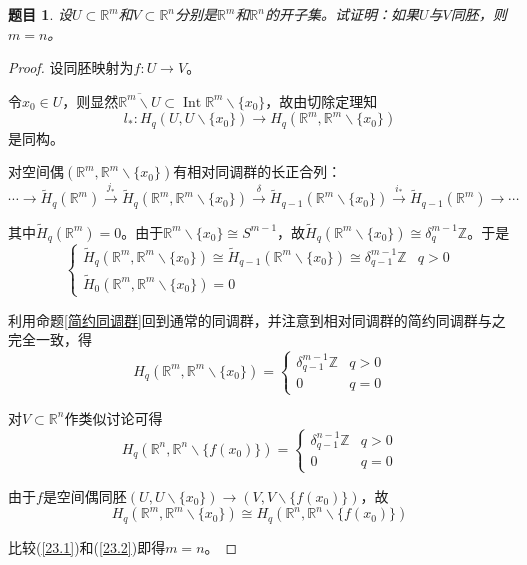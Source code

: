 \documentclass[UTF-8,11pt,fancyhdr,hyperref,titlepage]{ctexart}
\theoremstyle{question}
\newtheorem{timu}{题目}
\theoremstyle{theorem}
\theoremstyle{definition}
\theoremstyle{remark}
\def\RR{{\mathbb R}}
\def\ZZ{{\mathbb Z}}
\def\longto{\longrightarrow}
\def\To{\longto}
\newcommand{\markar}[1]{\stackrel{{#1}}{\longrightarrow}}%
\newcommand{\rH}[1]{\widetilde{H}_{#1}}
\DeclareMathOperator{\Int}{Int}
\begin{document}
\begin{timu}\label{23}
  设$U\subset\RR^m$和$V\subset\RR^n$分别是$\RR^m$和$\RR^n$的开子集。试证明：如果$U$与$V$同胚，则$m=n$。
\end{timu}
\begin{proof}
  设同胚映射为$f\colon U\To V$。

  令$x_0\in U$，则显然$\overline{\RR^m\backslash U}\subset\Int \RR^m\backslash\{x_0\}$，故由切除定理知
  \begin{equation*}
    l_{\ast}\colon H_q(U,U\backslash\{x_0\}) \To H_q(\RR^m,\RR^m\backslash\{x_0\})
  \end{equation*}
  是同构。

  对空间偶$(\RR^m, \RR^m\backslash\{x_0\})$有相对同调群的长正合列：
  \begin{equation*}
    \cdots\To \rH{q}(\RR^m) \markar{j_{\ast}} \rH{q}(\RR^m, \RR^m\backslash\{x_0\}) \markar{\delta} \rH{q-1}(\RR^m\backslash\{x_0\}) \markar{i_{\ast}} \rH{q-1}(\RR^m) \To \cdots
  \end{equation*}
  
  其中$\rH{q}(\RR^m)=0$。由于$\RR^m\backslash\{x_0\}\cong S^{m-1}$，故$\rH{q}(\RR^m\backslash\{x_0\})\cong\delta_q^{m-1}\ZZ$。于是
  \begin{equation*}
    \begin{cases}
      \rH{q}(\RR^m,\RR^m\backslash\{x_0\})\cong\rH{q-1}(\RR^m\backslash\{x_0\})\cong\delta_{q-1}^{m-1}\ZZ& q>0\\
      \rH{0}(\RR^m,\RR^m\backslash\{x_0\})=0
    \end{cases}
  \end{equation*}

  利用命题\ref{简约同调群}回到通常的同调群，并注意到相对同调群的简约同调群与之完全一致，得
  \begin{equation}\label{23.1}
    H_q(\RR^m,\RR^m\backslash\{x_0\})=
    \begin{cases}
      \delta_{q-1}^{m-1}\ZZ & q>0\\
      0 & q=0
    \end{cases}
  \end{equation}

  对$V\subset\RR^n$作类似讨论可得
  \begin{equation}\label{23.2}
    H_q(\RR^n,\RR^n\backslash\{f(x_0)\})=
    \begin{cases}
      \delta_{q-1}^{n-1}\ZZ & q>0\\
      0 & q=0
    \end{cases}
  \end{equation}

  由于$f$是空间偶同胚$(U,U\backslash\{x_0\})\To(V,V\backslash\{f(x_0)\})$，故
  \begin{equation*}
    H_q(\RR^m,\RR^m\backslash\{x_0\}) \cong H_q(\RR^n,\RR^n\backslash\{f(x_0)\})
  \end{equation*}

  比较(\ref{23.1})和(\ref{23.2})即得$m=n$。
\end{proof}
\end{document}
